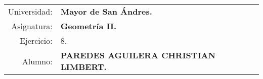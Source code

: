 \begin{tabular}{r l }
Universidad: & \textbf{Mayor de San Ándres.}\\
Asignatura: & \textbf{Geometría II.}\\
Ejercicio: & 8.\\ 
Alumno: & \textbf{PAREDES AGUILERA CHRISTIAN LIMBERT.}
\end{tabular}
\begin{flushleft}
\end{flushleft}
\vspace{.2cm}

